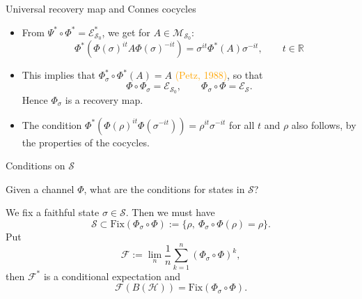 \documentclass[mathserif]{beamer}
\newcommand{\<}{\langle}
\renewcommand{\>}{\rangle}
\newcommand{\Se}{\mathcal S}
\newcommand{\Ee}{\mathcal E}
\newcommand{\Fe}{\mathcal F}
\newcommand{\Me}{\mathcal M}
\newcommand{\Ha}{\mathcal H}
\newcommand{\Le}{\mathcal L}
\newcommand{\Ka}{\mathcal K}
\begin{document}
%
%
%
%
%
%
%
\begin{frame}{Universal recovery map and Connes cocycles}

\begin{itemize}

\item From $\Psi^*\circ \Phi^*=\Ee^*_{\Se_0}$, we get for $A\in \Me_{\Se_0}$:
\[
\Phi^*(\Phi(\sigma)^{it}A\Phi(\sigma)^{-it})=\sigma^{it}\Phi^*(A)\sigma^{-it},\qquad t\in
\mathbb R
\]

\item This implies that  $\Phi_\sigma^*\circ\Phi^*(A)=A$ {\footnotesize \textcolor{orange}{ (Petz, 1988)}}, so that 
\[
\Phi\circ
\Phi_\sigma=\Ee_{\Se_0},\qquad  \Phi_\sigma\circ\Phi=\Ee_\Se.
\]
Hence  $\Phi_\sigma$ is a recovery map.

\item The condition $\Phi^*(\Phi(\rho)^{it}\Phi(\sigma^{-it}))=\rho^{it}\sigma^{-it}$ for
all $t$ and $\rho$ also follows,  by the properties of the cocycles.

\end{itemize}



\end{frame}




 
\begin{frame}{Conditions on $\Se$}


Given a channel $\Phi$, what are the conditions for states in $\Se$? 

\bigskip

We fix a faithful state $\sigma\in \Se$. Then we must have
\[
\Se\subset \mathrm{Fix}(\Phi_\sigma\circ\Phi):=\{\rho,\ \Phi_\sigma\circ\Phi(\rho)=\rho\}.
\]
Put
\[
\Fe:=\lim_n \frac1n\sum_{k=1}^n(\Phi_\sigma\circ\Phi)^k,
\]
then $\Fe^*$ is a conditional expectation and
\[
\Fe(B(\Ha))=\mathrm{Fix}(\Phi_\sigma\circ\Phi).
\]



\end{frame}
\end{document}
